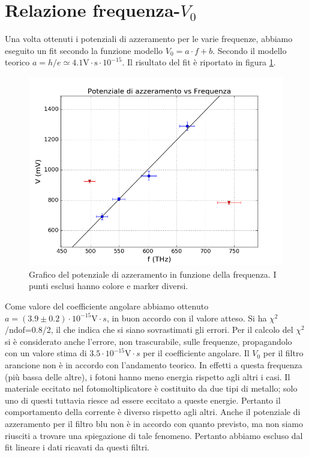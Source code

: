 \documentclass[10pt,a4paper]{article}
\begin{document}
\section{Relazione frequenza-$V_0$}
Una volta ottenuti i potenziali di azzeramento per le varie frequenze, abbiamo eseguito un fit secondo la funzione modello $V_0=a\cdot f + b$.
Secondo il modello teorico $a = h/e\simeq 4.1 \mbox{V}\cdot\mbox{s}\cdot10^{-15}$.
Il risultato del fit è riportato in figura \ref{fig:fitfinale}.
\begin{figure}[!htb]
\centering
\includegraphics[scale=0.7]{fitfinale.png}
\caption{Grafico del potenziale di azzeramento in funzione della frequenza. I punti esclusi hanno colore e marker diversi.\label{fig:fitfinale}}
\end{figure}

Come valore del coefficiente angolare abbiamo ottenuto $a = (3.9\pm 0.2)\cdot10^{-15} \mbox{V}\cdot{s}$, in buon accordo con il valore atteso.
Si ha $\chi ^2$/ndof=0.8/2, il che indica che si siano sovrastimati gli errori.
Per il calcolo del $\chi^2$ si è considerato anche l'errore, non trascurabile, sulle frequenze, propagandolo con un valore stima di $3.5\cdot 10^{-15}\mbox{V}\cdot{s}$ per il coefficiente angolare.
Il $V_0$ per il filtro arancione non è in accordo con l'andamento teorico. In effetti a questa frequenza (più bassa delle altre), i fotoni hanno meno energia rispetto agli altri i casi. Il materiale eccitato nel fotomoltiplicatore è costituito da due tipi di metallo; solo uno di questi tuttavia riesce ad essere eccitato a queste energie. Pertanto il comportamento della corrente è  diverso rispetto agli altri.
Anche il potenziale di azzeramento per il filtro blu non è in accordo con quanto previsto, ma non siamo riusciti a trovare una spiegazione di tale fenomeno. Pertanto abbiamo escluso dal fit lineare i dati ricavati da questi filtri.
\end{document}
